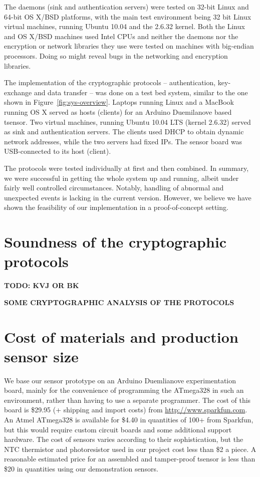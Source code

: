 The daemons (sink and authentication servers) were tested on 32-bit Linux and 64-bit OS X/BSD platforms, with the main test environment being 32 bit Linux virtual machines, running Ubuntu 10.04 and the 2.6.32 kernel. Both the Linux and OS X/BSD machines used Intel CPUs and neither the daemons nor the encryption or network libraries they use were tested on machines with big-endian processors. Doing so might reveal bugs in the networking and encryption libraries. 

The implementation of the cryptographic protocols -- authentication, key-exchange and data transfer -- was done on a test bed system, similar to the one shown in Figure~\ref{fig:sys-overview}. Laptops running Linux and a MacBook running OS X served as hosts (clients) for an Arduino Duemilanove based tsensor. Two virtual machines, running Ubuntu 10.04 LTS (kernel 2.6.32) served as sink and authentication servers. The clients used DHCP to obtain dynamic network addresses, while the two servers had fixed IPs. The sensor board was USB-connected to its host (client).

The protocols were tested individually at first and then combined. In summary, we were successful in getting the whole system up and running, albeit under fairly well controlled circumstances. Notably, handling of abnormal and unexpected events is lacking in the current version. However, we believe we have shown the feasibility of our implementation in a proof-of-concept setting.

\section{Soundness of the cryptographic protocols}
\label{sec:crypto-protocol-analysis}

\textbf{TODO: KVJ OR BK}

\textbf{SOME CRYPTOGRAPHIC ANALYSIS OF THE PROTOCOLS}

\section{Cost of materials and production sensor size}

We base our sensor prototype on an Arduino Duemlianove experimentation board, mainly for the convenience of programming the ATmega328 in such an environment, rather than having to use a separate programmer. The cost of this board is \$29.95 (+ shipping and import costs) from \url{http://www.sparkfun.com}. An Atmel ATmega328 is available for \$4.40 in quantities of 100+ from Sparkfun, but this would require custom circuit boards and some additional support hardware. The cost of sensors varies according to their sophistication, but the NTC thermistor and photoresistor used in our project cost less than \$2 a piece. A reasonable estimated price for an assembled and tamper-proof tsensor is less than \$20 in quantities using our demonstration sensors. 

